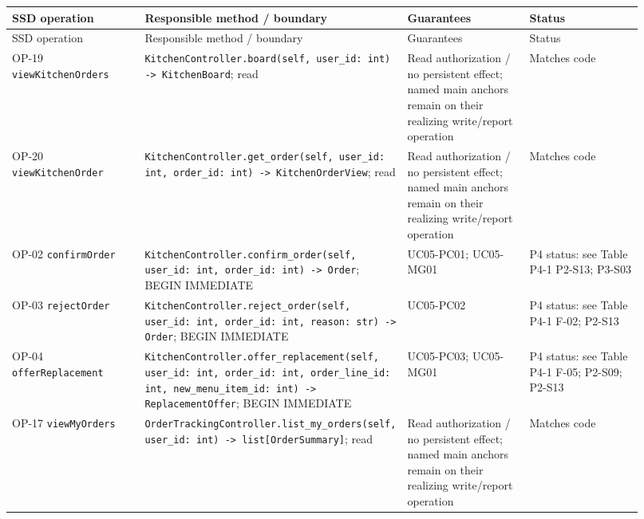 \begin{longtable}{>{\raggedright\arraybackslash}p{0.2300\linewidth}>{\raggedright\arraybackslash}p{0.2300\linewidth}>{\raggedright\arraybackslash}p{0.2300\linewidth}>{\raggedright\arraybackslash}p{0.2300\linewidth}}
SSD operation & Responsible method / boundary & Guarantees & Status \\
\hline\endfirsthead
SSD operation & Responsible method / boundary & Guarantees & Status \\
\hline\endhead
OP-19 \texttt{viewKitchenOrders} & \texttt{KitchenController.\allowbreak{}board(self, user\_\allowbreak{}id: int) -\textgreater{} KitchenBoard}; read & Read authorization / no persistent effect; named main anchors remain on their realizing write/report operation & Matches code \\
OP-20 \texttt{viewKitchenOrder} & \texttt{KitchenController.\allowbreak{}get\_\allowbreak{}order(self, user\_\allowbreak{}id: int, order\_\allowbreak{}id: int) -\textgreater{} KitchenOrderView}; read & Read authorization / no persistent effect; named main anchors remain on their realizing write/report operation & Matches code \\
OP-02 \texttt{confirmOrder} & \texttt{KitchenController.\allowbreak{}confirm\_\allowbreak{}order(self, user\_\allowbreak{}id: int, order\_\allowbreak{}id: int) -\textgreater{} Order}; BEGIN IMMEDIATE & UC05-PC01; UC05-MG01 & P4 status: see Table P4-1 P2-S13; P3-S03 \\
OP-03 \texttt{rejectOrder} & \texttt{KitchenController.\allowbreak{}reject\_\allowbreak{}order(self, user\_\allowbreak{}id: int, order\_\allowbreak{}id: int, reason: str) -\textgreater{} Order}; BEGIN IMMEDIATE & UC05-PC02 & P4 status: see Table P4-1 F-02; P2-S13 \\
OP-04 \texttt{offerReplacement} & \texttt{KitchenController.\allowbreak{}offer\_\allowbreak{}replacement(self, user\_\allowbreak{}id: int, order\_\allowbreak{}id: int, order\_\allowbreak{}line\_\allowbreak{}id: int, new\_\allowbreak{}menu\_\allowbreak{}item\_\allowbreak{}id: int) -\textgreater{} ReplacementOffer}; BEGIN IMMEDIATE & UC05-PC03; UC05-MG01 & P4 status: see Table P4-1 F-05; P2-S09; P2-S13 \\
OP-17 \texttt{viewMyOrders} & \texttt{OrderTrackingController.\allowbreak{}list\_\allowbreak{}my\_\allowbreak{}orders(self, user\_\allowbreak{}id: int) -\textgreater{} list[OrderSummary]}; read & Read authorization / no persistent effect; named main anchors remain on their realizing write/report operation & Matches code \\

\end{longtable}
